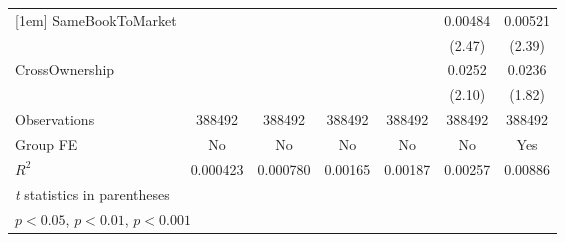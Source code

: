 {\begin{tabular}{l*{6}{c}}
[1em]
SameBookToMarket&                  &                  &                  &                  &  0.00484\sym{*}  &  0.00521\sym{*}  \\
                &                  &                  &                  &                  &   (2.47)         &   (2.39)         \\
[1em]
CrossOwnership  &                  &                  &                  &                  &   0.0252\sym{*}  &   0.0236         \\
                &                  &                  &                  &                  &   (2.10)         &   (1.82)         \\
\hline
Observations    &   388492         &   388492         &   388492         &   388492         &   388492         &   388492         \\
Group FE        &       No         &       No         &       No         &       No         &       No         &      Yes         \\
$ R^2 $         & 0.000423         & 0.000780         &  0.00165         &  0.00187         &  0.00257         &  0.00886         \\
\hline\hline
\multicolumn{7}{l}{\footnotesize \textit{t} statistics in parentheses}\\
\multicolumn{7}{l}{\footnotesize \sym{*} \(p<0.05\), \sym{**} \(p<0.01\), \sym{***} \(p<0.001\)}\\
\end{tabular}
}
